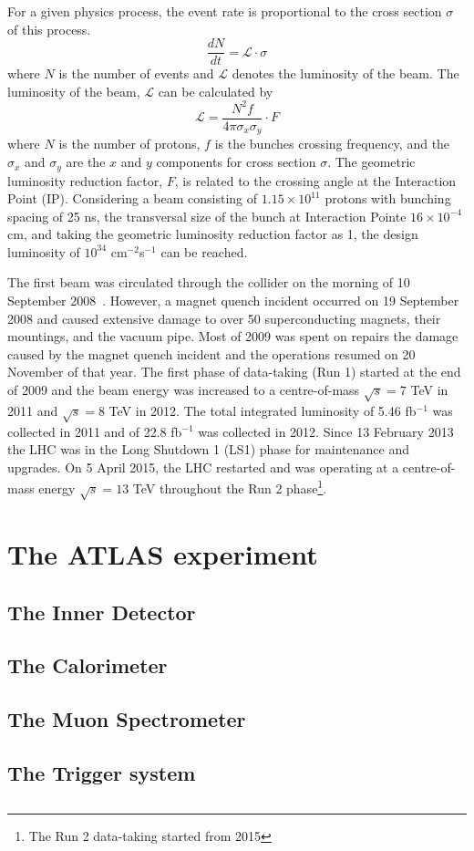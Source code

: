 For a given physics process, the event rate is proportional to the cross section $\sigma$ of this process.
\begin{equation}
\frac{dN}{dt} = \mathcal{L}\cdot\sigma
\end{equation}
where $N$ is the number of events and $\mathcal{L}$ denotes the luminosity of the beam.
The luminosity of the beam, $\mathcal{L}$ can be calculated by
\begin{equation}
\mathcal{L} = \frac{N^{2} f}{4 \pi \sigma_{x} \sigma_{y}} \cdot F
\end{equation}
where $N$ is the number of protons, $f$ is the bunches crossing frequency, and the $\sigma_{x}$ and $\sigma_{y}$ are the $x$ and $y$ components for cross section $\sigma$.
The geometric luminosity reduction factor, $F$, is related to the crossing angle at the Interaction Point (IP).
Considering a beam consisting of $1.15 \times 10^{11}$ protons with bunching spacing of 25 ns, the transversal size of the bunch at Interaction Pointe $16\times 10^{-4}$ cm, and taking the geometric luminosity reduction factor as 1, the design luminosity of $10^{34}$ cm$^{-2}$s$^{-1}$ can be reached.

The first beam was circulated through the collider on the morning of 10 September 2008~\cite{CERN-COURIER-Sep192008}.
However, a magnet quench incident occurred on 19 September 2008 and caused extensive damage to over 50 superconducting magnets, their mountings, and the vacuum pipe.
Most of 2009 was spent on repairs the damage caused by the magnet quench incident and the operations resumed on 20 November of that year.
The first phase of data-taking (Run 1) started at the end of 2009 and the beam energy was increased to a centre-of-mass $\sqrt{s}=7$ TeV in 2011 and $\sqrt{s} = 8$ TeV in 2012.
The total integrated luminosity of 5.46 fb$^{-1}$ was collected in 2011 and of 22.8 fb$^{-1}$ was collected in 2012.
Since 13 February 2013 the LHC was in the Long Shutdown 1 (LS1) phase for maintenance and upgrades.
On 5 April 2015, the LHC restarted and was operating at a centre-of-mass energy $\sqrt{s}=13$ TeV throughout the Run 2 phase\footnote{The Run 2 data-taking started from 2015}.



\section{The ATLAS experiment}

\subsection{The Inner Detector}

\subsection{The Calorimeter}

\subsection{The Muon Spectrometer}

\subsection{The Trigger system}

\subsection{}